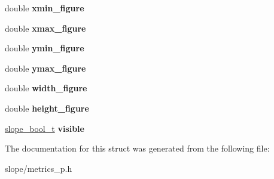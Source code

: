 \begin{DoxyCompactItemize}
\item 
\hypertarget{struct__slope__metrics_a435925cdf5bd35658acfb48dcd707b66}{double {\bfseries xmin\+\_\+figure}}\label{struct__slope__metrics_a435925cdf5bd35658acfb48dcd707b66}

\item 
\hypertarget{struct__slope__metrics_ae5a8b9e2c17313f5e8df3ba3a3d29fd2}{double {\bfseries xmax\+\_\+figure}}\label{struct__slope__metrics_ae5a8b9e2c17313f5e8df3ba3a3d29fd2}

\item 
\hypertarget{struct__slope__metrics_a6000828f5bc6d9c83d66aa7899ff36dc}{double {\bfseries ymin\+\_\+figure}}\label{struct__slope__metrics_a6000828f5bc6d9c83d66aa7899ff36dc}

\item 
\hypertarget{struct__slope__metrics_a7351a93e448f8dd9441d9319fd984ac7}{double {\bfseries ymax\+\_\+figure}}\label{struct__slope__metrics_a7351a93e448f8dd9441d9319fd984ac7}

\item 
\hypertarget{struct__slope__metrics_a6c276a074789c36f794b053afc0e7267}{double {\bfseries width\+\_\+figure}}\label{struct__slope__metrics_a6c276a074789c36f794b053afc0e7267}

\item 
\hypertarget{struct__slope__metrics_a2251d1d4ddf5113421470ee169821d0b}{double {\bfseries height\+\_\+figure}}\label{struct__slope__metrics_a2251d1d4ddf5113421470ee169821d0b}

\item 
\hypertarget{struct__slope__metrics_a28f142398e73765dbe70894078487c79}{\hyperlink{group__Primitives_gac55afa016ca777119a6c343d1655d558}{slope\+\_\+bool\+\_\+t} {\bfseries visible}}\label{struct__slope__metrics_a28f142398e73765dbe70894078487c79}

\end{DoxyCompactItemize}


The documentation for this struct was generated from the following file\+:\begin{DoxyCompactItemize}
\item 
slope/metrics\+\_\+p.\+h\end{DoxyCompactItemize}
